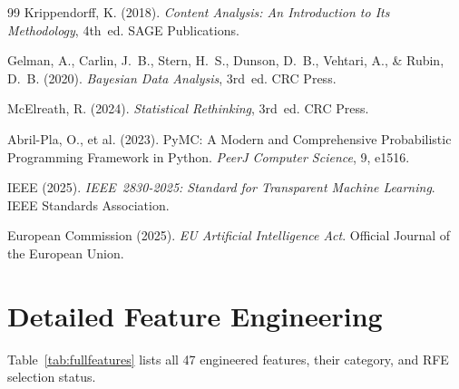 \documentclass[10pt,letterpaper]{article}
\begin{document}
\begin{thebibliography}{99}
Krippendorff, K. (2018).
\newblock \emph{Content Analysis: An Introduction to Its Methodology}, 4th~ed.
\newblock SAGE Publications.

Gelman, A., Carlin, J.~B., Stern, H.~S., Dunson, D.~B., Vehtari, A.,
  \& Rubin, D.~B. (2020).
\newblock \emph{Bayesian Data Analysis}, 3rd~ed.
\newblock CRC Press.

McElreath, R. (2024).
\newblock \emph{Statistical Rethinking}, 3rd~ed.
\newblock CRC Press.

Abril-Pla, O., et al. (2023).
\newblock PyMC: A Modern and Comprehensive Probabilistic Programming Framework
  in Python.
\newblock \emph{PeerJ Computer Science}, 9, e1516.

IEEE (2025).
\newblock \emph{IEEE~2830-2025: Standard for Transparent Machine Learning}.
\newblock IEEE Standards Association.

European Commission (2025).
\newblock \emph{EU Artificial Intelligence Act}.
\newblock Official Journal of the European Union.

\end{thebibliography}

\appendix

\section{Detailed Feature Engineering}
\label{app:features}

Table~\ref{tab:fullfeatures} lists all 47 engineered features, their category,
and RFE selection status.
\end{document}
